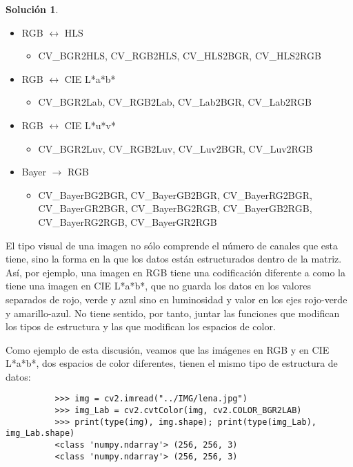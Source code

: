 \documentclass[a4paper, 11pt]{article}
\theoremstyle{definition}
\newtheorem*{solucion}{Solución}
\begin{document}
\begin{solucion}
\begin{itemize}
          \item RGB $\leftrightarrow$ HLS
              \begin{itemize}
                  \item CV\_BGR2HLS, CV\_RGB2HLS, CV\_HLS2BGR, CV\_HLS2RGB
              \end{itemize}

          \item RGB $\leftrightarrow$ CIE L*a*b*
              \begin{itemize}
                  \item CV\_BGR2Lab, CV\_RGB2Lab, CV\_Lab2BGR, CV\_Lab2RGB
              \end{itemize}

          \item RGB $\leftrightarrow$ CIE L*u*v*
              \begin{itemize}
                  \item CV\_BGR2Luv, CV\_RGB2Luv, CV\_Luv2BGR, CV\_Luv2RGB
              \end{itemize}

          \item Bayer $\rightarrow$ RGB
              \begin{itemize}
                  \item CV\_BayerBG2BGR, CV\_BayerGB2BGR, CV\_BayerRG2BGR, CV\_BayerGR2BGR, CV\_BayerBG2RGB, CV\_BayerGB2RGB, CV\_BayerRG2RGB, CV\_BayerGR2RGB
              \end{itemize}
      \end{itemize}

      El tipo visual de una imagen no sólo comprende el número de canales que esta tiene, sino la forma en la que los datos están estructurados dentro de la matriz. Así, por ejemplo, una imagen en RGB tiene una codificación diferente a como la tiene una imagen en CIE L*a*b*, que no guarda los datos en los valores separados de rojo, verde y azul sino en luminosidad y valor en los ejes rojo-verde y amarillo-azul. No tiene sentido, por tanto, juntar las funciones que modifican los tipos de estructura y las que modifican los espacios de color.

      Como ejemplo de esta discusión, veamos que las imágenes en RGB y en CIE L*a*b*, dos espacios de color diferentes, tienen el mismo tipo de estructura de datos:

      \begin{lstlisting}
          >>> img = cv2.imread("../IMG/lena.jpg")
          >>> img_Lab = cv2.cvtColor(img, cv2.COLOR_BGR2LAB)
          >>> print(type(img), img.shape); print(type(img_Lab), img_Lab.shape)
          <class 'numpy.ndarray'> (256, 256, 3)
          <class 'numpy.ndarray'> (256, 256, 3)
      \end{lstlisting}
  \end{solucion}
\end{document}
